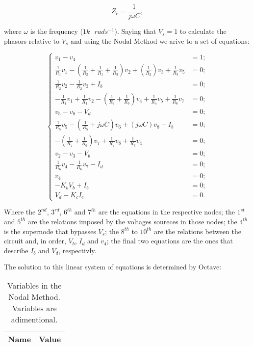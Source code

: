 \begin{equation}
	Z_c = \frac{1}{j \omega C},
\end{equation}

where $\omega$ is the frequency ($1k \text{ }rads^{-1}$).
Saying that $V_s = 1$ to calculate the phasors relative to $V_s$ and using the Nodal Method we arive to a set of equations:

\begin{equation}
\begin{cases}
	v_1 - v_4 &= 1;																				  	  \\
	\frac{1}{R_1}v_1 - (\frac{1}{R_2}+\frac{1}{R_1}+\frac{1}{R_3})v_2 + (\frac{1}{R_2})v_3 + \frac{1}{R_3}v_5 &= 0; \\
  	\frac{1}{R_2}v_2 - \frac{1}{R_2}v_3+ I_b &= 0;													  \\
  	-\frac{1}{R_1}v_1 + \frac{1}{R_1}v_2 - (\frac{1}{R_4}+\frac{1}{R_6})v_4 + \frac{1}{R_4}v_5 + \frac{1}{R_6}v_7 &= 0;			  																	  \\
	v_5 - v_8 - V_d &= 0;																			  \\
  	\frac{1}{R_5}v_5 - (\frac{1}{R_5} + j \omega C)v_6 + (j \omega C)v_8- I_b &= 0;						  \\
  	-(\frac{1}{R_7}+\frac{1}{R_6})v_7 + \frac{1}{R_7}v_8 + \frac{1}{R_6}v_4 &= 0;					  \\
	v_2 - v_3 - V_b &= 0;																			  \\
  	\frac{1}{R_6}v_4 - \frac{1}{R_6}v_7 - I_d &= 0;													  \\
  	v_4 &= 0;																						  \\
  	-K_bV_b + I_b &= 0;																				  \\
  	V_d - K_cI_c &= 0.
\end{cases}
\label{eq:PASSO4}
\end{equation}

Where the $2^{nd}$, $3^{rd}$, $6^{th}$ and $7^{th}$ are the equations in the respective nodes; the $1^{st}$ and $5^{th}$ are the relations imposed by the voltages soureces in those nodes; the $4^{th}$ is the supernode that bypasses $V_s$; the $8^{th}$ to $10^{th}$ are the relations between the circuit and, in order, $V_b$, $I_d$ and $v_4$; the final two equations are the ones that describe $I_b$ and $V_d$, respectivly. 

The solution to this linear system of equations is determined by Octave:

\begin{table}[h]
  \centering
  \begin{tabular}{|l|r|}
    \hline    
    {\bf Name} & {\bf Value} \\ \hline
    
  \end{tabular}
  \caption{Variables in the Nodal Method. Variables are adimentional.}
  \label{tab:TEO_PASSO4}
\end{table}

